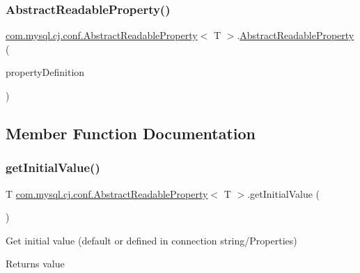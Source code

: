 \subsubsection{\texorpdfstring{Abstract\+Readable\+Property()}{AbstractReadableProperty()}\hspace{0.1cm}{\footnotesize\ttfamily [2/2]}}
{\footnotesize\ttfamily \mbox{\hyperlink{classcom_1_1mysql_1_1cj_1_1conf_1_1_abstract_readable_property}{com.\+mysql.\+cj.\+conf.\+Abstract\+Readable\+Property}}$<$ T $>$.\mbox{\hyperlink{classcom_1_1mysql_1_1cj_1_1conf_1_1_abstract_readable_property}{Abstract\+Readable\+Property}} (\begin{DoxyParamCaption}\item[{\mbox{\hyperlink{interfacecom_1_1mysql_1_1cj_1_1conf_1_1_property_definition}{Property\+Definition}}$<$ T $>$}]{property\+Definition }\end{DoxyParamCaption})\hspace{0.3cm}{\ttfamily [protected]}}



\subsection{Member Function Documentation}
\mbox{\label{classcom_1_1mysql_1_1cj_1_1conf_1_1_abstract_readable_property_a8848d72c6bd0795fe6585242d546f050}} 
\subsubsection{\texorpdfstring{get\+Initial\+Value()}{getInitialValue()}}
{\footnotesize\ttfamily T \mbox{\hyperlink{classcom_1_1mysql_1_1cj_1_1conf_1_1_abstract_readable_property}{com.\+mysql.\+cj.\+conf.\+Abstract\+Readable\+Property}}$<$ T $>$.get\+Initial\+Value (\begin{DoxyParamCaption}{ }\end{DoxyParamCaption})}

Get initial value (default or defined in connection string/\+Properties)

\begin{DoxyReturn}{Returns}
value 
\end{DoxyReturn}


